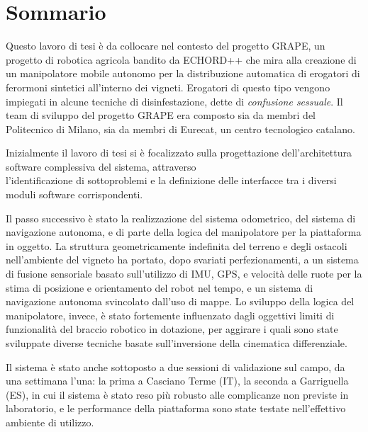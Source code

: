 \chapter*{Sommario}
Questo lavoro di tesi è da collocare nel contesto del progetto \ac{GRAPE}, un progetto di robotica agricola bandito da \ac{ECHORD++} che mira alla creazione di un manipolatore mobile autonomo per la distribuzione automatica di erogatori di ferormoni sintetici all'interno dei vigneti. Erogatori di questo tipo vengono impiegati in alcune tecniche di disinfestazione, dette di \textit{confusione sessuale}.
Il team di sviluppo del progetto \ac{GRAPE} era composto sia da membri del Politecnico di Milano, sia da membri di Eurecat, un centro tecnologico catalano.
\par Inizialmente il lavoro di tesi si è focalizzato sulla progettazione dell'architettura software complessiva del sistema, attraverso \\l'identificazione di sottoproblemi e la definizione delle interfacce  tra i diversi moduli software corrispondenti.
\par Il passo successivo è stato la realizzazione del sistema odometrico, del sistema di navigazione autonoma, e di parte della logica del manipolatore per la piattaforma in oggetto. 
La struttura geometricamente indefinita del terreno e degli ostacoli nell'ambiente del vigneto ha portato, dopo svariati perfezionamenti, a un sistema di fusione sensoriale basato sull'utilizzo di \ac{IMU}, GPS, e velocità delle ruote per la stima di posizione e orientamento del robot nel tempo, e un sistema di navigazione autonoma svincolato dall'uso di mappe. Lo sviluppo della logica del manipolatore, invece, è stato fortemente influenzato dagli oggettivi limiti di funzionalità del braccio robotico in dotazione, per aggirare i quali sono state sviluppate diverse tecniche basate sull'inversione della cinematica differenziale.
\par Il sistema è stato anche sottoposto a due sessioni di validazione sul campo, da una settimana l'una: la prima a Casciano Terme (IT), la seconda a Garriguella (ES), in cui il sistema è stato reso più robusto alle complicanze non previste in laboratorio, e le performance della piattaforma sono state testate nell'effettivo ambiente di utilizzo.

\endgroup











